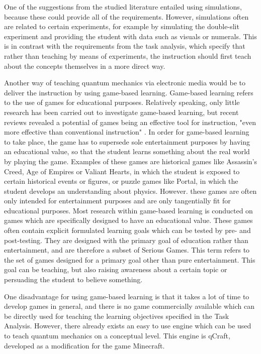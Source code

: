 \documentclass[11pt,twoside]{report} %
\begin{document}
One of the suggestions from the studied literature entailed using simulations, because these could provide all of the requirements. However, simulations often are related to certain experiments, for example by simulating the double-slit experiment and providing the student with data such as visuals or numerals. This is in contrast with the requirements from the task analysis, which specify that rather than teaching by means of experiments, the instruction should first teach about the concepts themselves in a more direct way.

Another way of teaching quantum mechanics via electronic media would be to deliver the instruction by using game-based learning. Game-based learning refers to the use of games for educational purposes. Relatively speaking, only little research has been carried out to investigate game-based learning, but recent reviews revealed a potential of games being an effective tool for instruction, "even more effective than conventional instruction" \cite[p.~1]{wouters}. In order for game-based learning to take place, the game has to supersede sole entertainment purposes by having an educational value, so that the student learns something about the real world by playing the game. Examples of these games are historical games like Assassin's Creed, Age of Empires or Valiant Hearts, in which the student is exposed to certain historical events or figures, or puzzle games like Portal, in which the student develops an understanding about physics. However. these games are often only intended for entertainment purposes and are only tangentially fit for educational purposes. Most research within game-based learning is conducted on games which are specifically designed to have an educational value. These games often contain explicit formulated learning goals which can be tested by pre- and post-testing. They are designed with the primary goal of education rather than entertainment, and are therefore a subset of Serious Games. This term refers to the set of games designed for a primary goal other than pure entertainment. This goal can be teaching, but also raising awareness about a certain topic or persuading the student to believe something.

One disadvantage for using game-based learning is that it takes a lot of time to develop games in general, and there is no game commercially available which can be directly used for teaching the learning objectives specified in the Task Analysis. However, there already exists an easy to use engine which can be used to teach quantum mechanics on a conceptual level. This engine is qCraft, developed as a modification for the game Minecraft.
\end{document}
